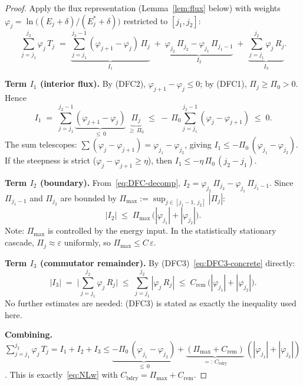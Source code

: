 \documentclass[12pt,a4paper]{article}
\theoremstyle{definition}
\theoremstyle{plain}
\theoremstyle{remark}
\begin{document}
\begin{proof}
Apply the flux representation (Lemma~\ref{lem:flux} below) with weights
$\varphi_j = \ln\bigl((E_j+\delta)/(E_j^*+\delta)\bigr)$
restricted to $[j_1, j_2]$:
\begin{equation}\label{eq:DFC-decomp}
  \sum_{j=j_1}^{j_2} \varphi_j\,T_j
  \;=\;
  \underbrace{\sum_{j=j_1}^{j_2-1}
    (\varphi_{j+1} - \varphi_j)\,\Pi_j}_{I_1}
  \;+\;
  \underbrace{\varphi_{j_2}\,\Pi_{j_2}
    - \varphi_{j_1}\,\Pi_{j_1-1}}_{I_2}
  \;+\;
  \underbrace{\sum_{j=j_1}^{j_2} \varphi_j\,R_j}_{I_3}.
\end{equation}

\textbf{Term $I_1$ (interior flux).}\;
By (DFC2), $\varphi_{j+1} - \varphi_j \le 0$; by (DFC1),
$\Pi_j \ge \Pi_0 > 0$. Hence
\[
  I_1
  \;=\; \sum_{j=j_1}^{j_2-1}
    \underbrace{(\varphi_{j+1} - \varphi_j)}_{\le\, 0}\;
    \underbrace{\Pi_j}_{\ge\, \Pi_0}
  \;\le\; -\,\Pi_0
    \sum_{j=j_1}^{j_2-1}(\varphi_j - \varphi_{j+1})
  \;\le\; 0.
\]
The sum telescopes: $\sum(\varphi_j - \varphi_{j+1}) =
\varphi_{j_1} - \varphi_{j_2}$, giving
$I_1 \le -\Pi_0\,(\varphi_{j_1} - \varphi_{j_2})$.
If the steepness is strict ($\varphi_j - \varphi_{j+1} \ge \eta$),
then $I_1 \le -\eta\,\Pi_0\,(j_2 - j_1)$.

\textbf{Term $I_2$ (boundary).}\;
From~\eqref{eq:DFC-decomp}, $I_2 = \varphi_{j_2}\,\Pi_{j_2}
- \varphi_{j_1}\,\Pi_{j_1-1}$. Since $\Pi_{j_1-1}$ and $\Pi_{j_2}$ are
bounded by $\Pi_{\max} := \sup_{j \in [j_1-1,\,j_2]}|\Pi_j|$:
\begin{equation}\label{eq:I2-bound}
  |I_2|
  \;\le\;
  \Pi_{\max}\,\bigl(|\varphi_{j_1}| + |\varphi_{j_2}|\bigr).
\end{equation}
Note: $\Pi_{\max}$ is controlled by the energy input.  In the
statistically stationary cascade, $\Pi_j \approx \varepsilon$ uniformly,
so $\Pi_{\max} \le C\,\varepsilon$.

\textbf{Term $I_3$ (commutator remainder).}\;
By (DFC3)~\eqref{eq:DFC3-concrete} directly:
\begin{equation}\label{eq:I3-bound}
  |I_3|
  \;=\;
  \biggl|\sum_{j=j_1}^{j_2} \varphi_j\,R_j\biggr|
  \;\le\;
  \sum_{j=j_1}^{j_2} |\varphi_j\,R_j|
  \;\le\;
  C_{\mathrm{rem}}\,\bigl(|\varphi_{j_1}| + |\varphi_{j_2}|\bigr).
\end{equation}
No further estimates are needed: (DFC3) is stated as exactly the
inequality used here.

\medskip\noindent
\textbf{Combining.}\;
$\sum_{j=j_1}^{j_2} \varphi_j\,T_j
= I_1 + I_2 + I_3
\le \underbrace{-\Pi_0\,(\varphi_{j_1}-\varphi_{j_2})}_{\le\,0}
+ \underbrace{(\Pi_{\max} + C_{\mathrm{rem}})}_
  {=:\,C_{\mathrm{bdry}}}
\,(|\varphi_{j_1}|+|\varphi_{j_2}|)$.
This is exactly~\eqref{eq:NLw} with
$C_{\mathrm{bdry}} = \Pi_{\max} + C_{\mathrm{rem}}$.
\end{proof}
\end{document}
